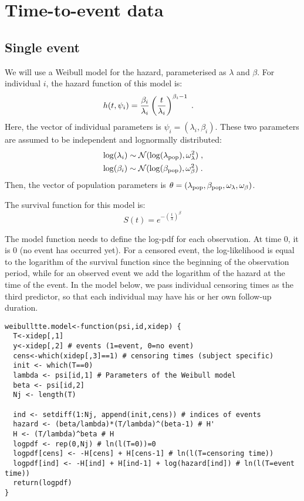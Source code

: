 \section{Time-to-event data}

\subsection{Single event} \label{sec:lungtte}

We will use a Weibull model for the hazard, parameterised as $\lambda$ and $\beta$. For individual $i$, the hazard function of this model is:
\begin{align}\label{weibullmodel}
& h(t, \psi_i) = \frac{\beta_i}{\lambda_i}\left(\frac{t}{\lambda_i}\right)^{\beta_i-1}\;.
\end{align}
Here, the vector of individual parameters is $\psi_i = (\lambda_i, \beta_i)$. These two parameters are assumed to be independent and  lognormally distributed:
\begin{align} \label{indivtte}
& \log(\lambda_i) \sim \mathcal{N}(\log(\lambda_{\rm pop}), \omega^2_{\lambda})\;,\\
& \log(\beta_i) \sim \mathcal{N}(\log(\beta_{\rm pop}), \omega^2_{\beta})\;.
\end{align}
Then, the vector of population parameters is $\theta = (\lambda_{\rm pop}, \beta_{\rm pop}, \omega_{\lambda}, \omega_{\beta})$.

The survival function for this model is:
$$ S(t) = e^{ - \left( \frac{t}{\lambda} \right) ^{\beta}}$$

The model function needs to define the log-pdf for each observation. At time 0, it is 0 (no event has occurred yet). For a censored event, the log-likelihood is equal to the logarithm of the survival function since the beginning of the observation period, while for an observed event we add the logarithm of the hazard at the time of the event. In the model below, we pass individual censoring times as the third predictor, so that each individual may have his or her own follow-up duration.

\begin{verbatim}
weibulltte.model<-function(psi,id,xidep) {
  T<-xidep[,1]
  y<-xidep[,2] # events (1=event, 0=no event)
  cens<-which(xidep[,3]==1) # censoring times (subject specific)
  init <- which(T==0)
  lambda <- psi[id,1] # Parameters of the Weibull model
  beta <- psi[id,2]
  Nj <- length(T)
  
  ind <- setdiff(1:Nj, append(init,cens)) # indices of events
  hazard <- (beta/lambda)*(T/lambda)^(beta-1) # H'
  H <- (T/lambda)^beta # H
  logpdf <- rep(0,Nj) # ln(l(T=0))=0
  logpdf[cens] <- -H[cens] + H[cens-1] # ln(l(T=censoring time))
  logpdf[ind] <- -H[ind] + H[ind-1] + log(hazard[ind]) # ln(l(T=event time))
  return(logpdf)
}
\end{verbatim}


